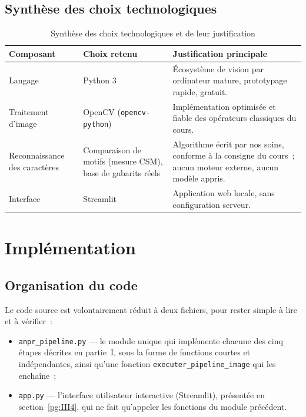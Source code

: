 \documentclass[11pt,a4paper]{article}
\begin{document}
\subsection{Synthèse des choix technologiques}
\label{pg:II4}

\begin{table}[H]
\centering
\footnotesize
\begin{tabularx}{\textwidth}{@{}L{2.9cm} L{3.6cm} X@{}}
\toprule
\textbf{Composant} & \textbf{Choix retenu} & \textbf{Justification principale}\\
\midrule
Langage & Python 3 & Écosystème de vision par ordinateur mature, prototypage rapide, gratuit.\\
Traitement d'image & OpenCV (\texttt{opencv-python}) & Implémentation optimisée et fiable des opérateurs classiques du cours.\\
Reconnaissance des caractères & Comparaison de motifs (mesure CSM), base de gabarits réels & Algorithme écrit par nos soins, conforme à la consigne du cours~; aucun moteur externe, aucun modèle appris.\\
Interface & Streamlit & Application web locale, sans configuration serveur.\\
\bottomrule
\end{tabularx}
\caption{Synthèse des choix technologiques et de leur justification}
\end{table}

\section{Implémentation}
\label{pg:III}

\subsection{Organisation du code}
\label{pg:III0}

Le code source est volontairement réduit à deux fichiers, pour rester simple à lire et à vérifier~:

\begin{itemize}
\item \texttt{anpr\_pipeline.py} --- le module unique qui implémente chacune des cinq étapes décrites en partie~I, sous la forme de fonctions courtes et indépendantes, ainsi qu'une fonction \texttt{executer\_pipeline\_image} qui les enchaîne~;
\item \texttt{app.py} --- l'interface utilisateur interactive (Streamlit), présentée en section~\ref{pg:III4}, qui ne fait qu'appeler les fonctions du module précédent.
\end{itemize}
\end{document}
